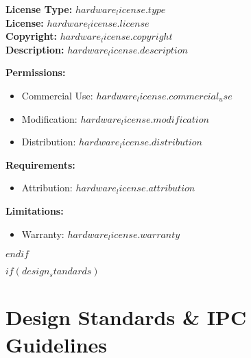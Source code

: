 \documentclass[11pt,a4paper]{article}
\begin{document}
\begin{tcolorbox}[
    colback=green!5!white,
    colframe=green!50!black,
    title=Open Source Hardware License,
    fonttitle=\bfseries
]

\textbf{License Type:} $hardware_license.type$\\[0.2cm]
\textbf{License:} $hardware_license.license$\\[0.2cm]
\textbf{Copyright:} $hardware_license.copyright$\\[0.2cm]

\textbf{Description:} $hardware_license.description$

\vspace{0.3cm}
\textbf{Permissions:}
\begin{itemize}
    \item Commercial Use: $hardware_license.commercial_use$
    \item Modification: $hardware_license.modification$
    \item Distribution: $hardware_license.distribution$
\end{itemize}

\textbf{Requirements:}
\begin{itemize}
    \item Attribution: $hardware_license.attribution$
\end{itemize}

\textbf{Limitations:}
\begin{itemize}
    \item Warranty: $hardware_license.warranty$
\end{itemize}

\end{tcolorbox}
\newpage
$endif$

$if(design_standards)$
\section*{Design Standards \& IPC Guidelines}
\end{document}
